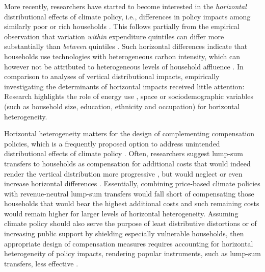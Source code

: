 \documentclass[12pt, a4paper]{article}
\begin{document}
More recently, researchers have started to become interested in the \textit{horizontal} distributional effects of climate policy, i.e., differences in policy impacts among similarly poor or rich households \autocite{Rausch.2011,Fischer.2019}. This follows partially from the empirical observation that variation \textit{within} expenditure quintiles can differ more substantially than \textit{between} quintiles \autocite{Cronin.2019,Steckel.2021b,Pizer.2019}. Such horizontal differences indicate that households use technologies with heterogeneous carbon intensity, which can however not be attributed to heterogeneous levels of household affluence \autocite{Hansel.2022}. In comparison to analyses of vertical distributional impacts, empirically investigating the determinants of horizontal impacts received little attention: Research highlights the role of energy use \autocite{Steckel.2021b,Missbach.2024}, space \autocite{Chan.2023,Burtraw.2009} or sociodemographic variables (such as household size, education, ethnicity and occupation) \autocite{Grainger.2010,Buchs.2013,Farrell.2017,Missbach.2023,Fremstad.2019} for horizontal heterogeneity.

Horizontal heterogeneity matters for the design of complementing compensation policies, which is a frequently proposed option to address unintended distributional effects of climate policy \autocite{Klenert.2018,Baranzini.2017}. Often, researchers suggest lump-sum transfers to households as compensation for additional costs \autocite{Stiglitz.2017,Baranzini.2000,Metcalf.2009} that would indeed render the vertical distribution more progressive \autocite{Budolfson.2021,vanderPloeg.2022}, but would neglect or even increase horizontal differences \autocite{Cronin.2019,Hansel.2022}. Essentially, combining price-based climate policies with revenue-neutral lump-sum transfers would fall short of compensating those households that would bear the highest additional costs and such remaining costs would remain higher for larger levels of horizontal heterogeneity. Assuming climate policy should also serve the purpose of least distributive distortions \autocite{Fischer.2019} or of increasing public support by shielding especially vulnerable households, then appropriate design of compensation measures requires accounting for horizontal heterogeneity of policy impacts, rendering popular instruments, such as lump-sum transfers, less effective \autocite{Fullerton.2019,Missbach.2024}. 
\end{document}
